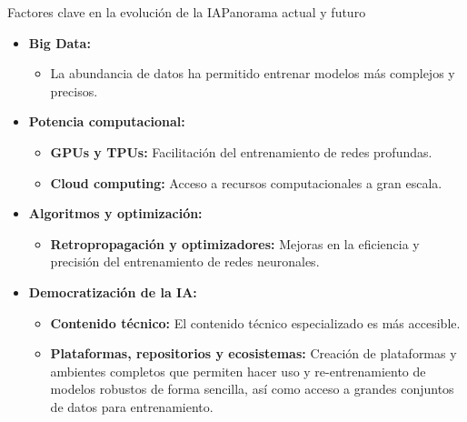 \documentclass[10pt,border=3pt,tikz]{beamer}
\begin{document}
    \begin{frame}{Factores clave en la evolución de la IA}{Panorama actual y futuro}
        \begin{itemize}
            \item \textbf{Big Data: }
            \begin{itemize}
                \item La abundancia de datos ha permitido entrenar modelos más complejos y precisos.
            \end{itemize}
            \item \textbf{Potencia computacional:}
            \begin{itemize}
                \item \textbf{GPUs y TPUs:} Facilitación del entrenamiento de redes profundas.
                \item \textbf{Cloud computing:} Acceso a recursos computacionales a gran escala.
            \end{itemize}
            \item \textbf{Algoritmos y optimización:}
            \begin{itemize}
                \item \textbf{Retropropagación y optimizadores:} Mejoras en la eficiencia y precisión del entrenamiento de redes neuronales.
            \end{itemize}
            \item \textbf{Democratización de la IA:}
            \begin{itemize}
                \item \textbf{Contenido técnico:} El contenido técnico especializado es más accesible.
                \item \textbf{Plataformas, repositorios y ecosistemas:} Creación de plataformas y ambientes completos que permiten hacer uso y re-entrenamiento de modelos robustos de forma sencilla, así como acceso a grandes conjuntos de datos para entrenamiento.
            \end{itemize}
        \end{itemize}
    \end{frame}
    
\end{document}
